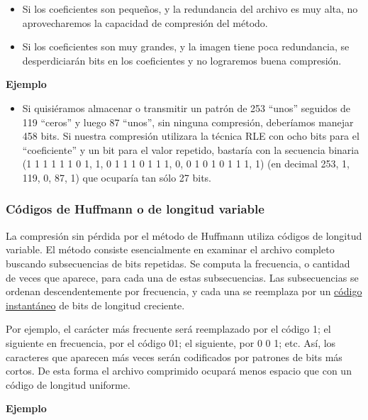\documentclass[spanish,A4,]{article}
\begin{document}
\begin{itemize}
\itemsep1pt\parskip0pt
\item
  Si los coeficientes son pequeños, y la redundancia del archivo es muy
  alta, no aprovecharemos la capacidad de compresión del método.
\item
  Si los coeficientes son muy grandes, y la imagen tiene poca
  redundancia, se desperdiciarán bits en los coeficientes y no
  lograremos buena compresión.
\end{itemize}

\textbf{Ejemplo}

\begin{itemize}
\itemsep1pt\parskip0pt
\item
  Si quisiéramos almacenar o transmitir un patrón de 253 ``unos''
  seguidos de 119 ``ceros'' y luego 87 ``unos'', sin ninguna compresión,
  deberíamos manejar 458 bits. Si nuestra compresión utilizara la
  técnica RLE con ocho bits para el ``coeficiente'' y un bit para el
  valor repetido, bastaría con la secuencia binaria (1 1 1 1 1 1 0 1, 1,
  0 1 1 1 0 1 1 1, 0, 0 1 0 1 0 1 1 1, 1) (en decimal 253, 1, 119, 0, 87, 1) que
  ocuparía tan sólo 27 bits.
\end{itemize}

\subsubsection{Códigos de Huffmann o de longitud
variable}\label{cuxf3digos-de-huffmann-o-de-longitud-variable}

La compresión sin pérdida por el método de Huffmann utiliza códigos de
longitud variable. El método consiste esencialmente en examinar el
archivo completo buscando subsecuencias de bits repetidas. Se computa la
frecuencia, o cantidad de veces que aparece, para cada una de estas
subsecuencias. Las subsecuencias se ordenan descendentemente por
frecuencia, y cada una se reemplaza por un
\href{https://es.m.wikipedia.org/wiki/C\%C3\%B3digo sub prefijo}{código
instantáneo} de bits de longitud creciente.

Por ejemplo, el carácter más frecuente será reemplazado por el código 1;
el siguiente en frecuencia, por el código 01; el siguiente, por 0 0 1;
etc. Así, los caracteres que aparecen más veces serán codificados por
patrones de bits más cortos. De esta forma el archivo comprimido ocupará
menos espacio que con un código de longitud uniforme.

\textbf{Ejemplo}
\end{document}
